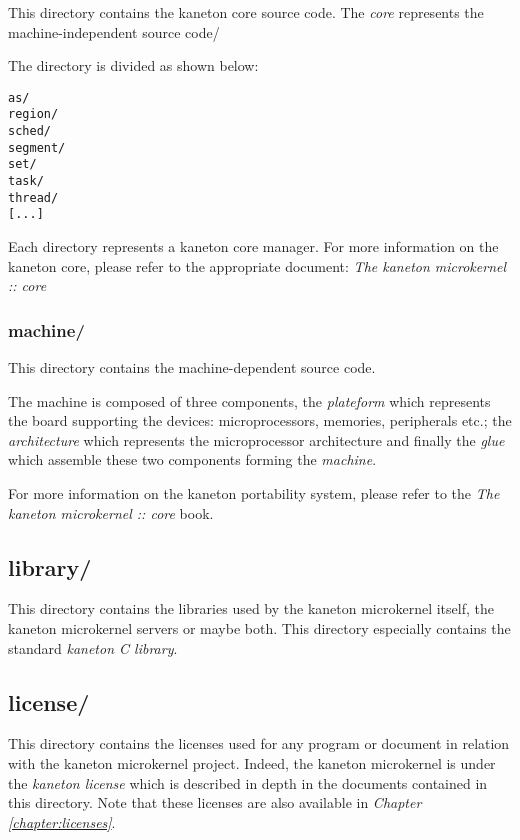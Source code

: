 This directory contains the kaneton core source code. The \textit{core}
represents the machine-independent source code/

The directory is divided as shown below:

\begin{verbatim}
as/
region/
sched/
segment/
set/
task/
thread/
[...]
\end{verbatim}

Each directory represents a kaneton core manager. For more information on
the kaneton core, please refer to the appropriate document:
\textit{The kaneton microkernel :: core}


\subsubsection*{machine/}

This directory contains the machine-dependent source code.

The machine is composed of three components, the \textit{plateform} which
represents the board supporting the devices: microprocessors, memories,
peripherals etc.; the \textit{architecture} which represents the microprocessor
architecture and finally the \textit{glue} which assemble these two
components forming the \textit{machine}.

For more information on the kaneton portability system, please refer to the
\textit{The kaneton microkernel :: core} book.

%
%

\subsection*{library/}

This directory contains the libraries used by the kaneton microkernel itself,
the kaneton microkernel servers or maybe both. This directory especially
contains the standard \textit{kaneton C library}.

%
%

\subsection*{license/}

This directory contains the licenses used for any program or document
in relation with the kaneton microkernel project. Indeed, the kaneton
microkernel is under the \textit{kaneton license} which is described in
depth in the documents contained in this directory. Note that these licenses
are also available in \textit{Chapter \ref{chapter:licenses}}.

